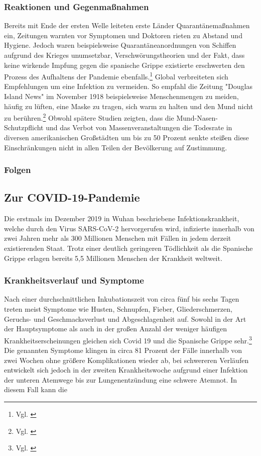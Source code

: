 \documentclass[12pt]{article}
\begin{document}
\subsubsection{Reaktionen und Gegenmaßnahmen}
Bereits mit Ende der ersten Welle leiteten erste Länder Quarantänemaßnahmen ein, Zeitungen warnten vor Symptomen und Doktoren rieten zu Abstand und Hygiene. Jedoch waren beispielsweise Quarantäneanordnungen von Schiffen aufgrund des Krieges unumsetzbar, Verschwörungstheorien und der Fakt, dass keine wirkende Impfung gegen die spanische Grippe existierte erschwerten den Prozess des Aufhaltens der Pandemie ebenfalls.\footnote{Vgl. \cite{Hist10}} Global verbreiteten sich Empfehlungen um eine Infektion zu vermeiden. So empfahl die Zeitung "Douglas Island News" im November 1918 beispielsweise Menschenmengen zu meiden, häufig zu lüften, eine Maske zu tragen, sich warm zu halten und den Mund nicht zu berühren.\footnote{Vgl. \cite{Mai2021}} Obwohl spätere Studien zeigten, dass die Mund-Nasen-Schutzpflicht und das Verbot von Massenveranstaltungen die Todesrate in diversen amerikanischen Großstädten um bis zu 50 Prozent senkte steißen diese Einschränkungen nicht in allen Teilen der Bevölkerung auf Zustimmung.
\subsubsection{Folgen}

\subsection{Zur COVID-19-Pandemie}
Die erstmals im Dezember 2019 in Wuhan beschriebene Infektionskrankheit, welche durch den Virus SARS-CoV-2 hervorgerufen wird, infizierte innerhalb von zwei Jahren mehr als 300 Millionen Menschen mit Fällen in jedem derzeit existierenden Staat. Trotz einer deutlich geringeren Tödlichkeit als die Spanische Grippe erlagen bereits 5,5 Millionen Menschen der Krankheit weltweit. 
\subsubsection{Krankheitsverlauf und Symptome}
 Nach einer durchschnittlichen Inkubationszeit von circa fünf bis sechs Tagen treten meist Symptome wie Husten, Schnupfen, Fieber, Gliederschmerzen, Geruchs- und Geschmacksverlust und Abgeschlagenheit auf. Sowohl in der Art der Hauptsymptome als auch in der großen Anzahl der weniger häufigen Krankheitserscheinungen gleichen sich Covid 19 und die Spanische Grippe sehr.\footnote{Vgl. \cite{Gov21}} Die genannten Symptome klingen in circa 81 Prozent der Fälle innerhalb von zwei Wochen ohne größere Komplikationen wieder ab, bei schwereren Verläufen entwickelt sich jedoch in der zweiten Krankheitswoche aufgrund einer Infektion der unteren Atemwege bis zur Lungenentzündung eine schwere Atemnot. In diesem Fall kann die 
\end{document}
